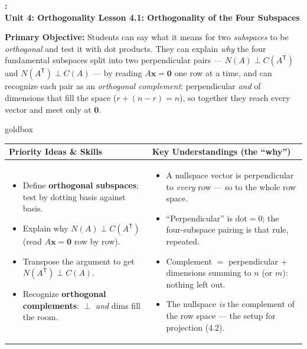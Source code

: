 \documentclass[10pt]{article}
\newcommand{\xx}{\mathbf{x}}
\newcommand{\zero}{\mathbf{0}}
\newcommand{\T}{\mathsf{T}}
\newcommand{\UnitNumberName}{Unit 4: Orthogonality \quad}
\newcommand{\LessonNumberName}{Lesson 4.1: Orthogonality of the Four Subspaces}
\begin{document}
\begin{center}
    {\Large\bfseries \CourseName: \SchoolYear \\
    {\small\bfseries \UnitNumberName \LessonNumberName}}
\end{center}

\begin{tcolorbox}[colback=blush, colframe=burgundy, boxrule=0.9pt, arc=2mm,
    left=2mm, right=2mm, top=1.5mm, bottom=1.5mm]
    \textbf{Primary Objective:} Students can say what it means for two \emph{subspaces} to be
    \emph{orthogonal} and test it with dot products. They can explain \emph{why} the four fundamental
    subspaces split into two perpendicular pairs --- $N(A)\perp C(A^{\T})$ and $N(A^{\T})\perp C(A)$ ---
    by reading $A\xx=\zero$ one row at a time, and can recognize each pair as an \emph{orthogonal
    complement}: perpendicular \emph{and} of dimensions that fill the space ($r+(n-r)=n$), so together
    they reach every vector and meet only at $\zero$.
\end{tcolorbox}

\renewcommand{\arraystretch}{1.4}
\begin{skillbox}{goldbox}
\begin{tabularx}{\linewidth}{@{}X|X@{}}
\textbf{Priority Ideas \& Skills} & \textbf{Key Understandings (the ``why'')} \\[2pt]
\hline
\vspace{-6pt}
\begin{itemize}[leftmargin=1.1em, nosep, after=\vspace{2pt}]
  \item Define \textbf{orthogonal subspaces}; test by dotting basis against basis.
  \item Explain why $N(A)\perp C(A^{\T})$ (read $A\xx=\zero$ row by row).
  \item Transpose the argument to get $N(A^{\T})\perp C(A)$.
  \item Recognize \textbf{orthogonal complements}: $\perp$ \emph{and} dims fill the room.
\end{itemize}
&
\vspace{-6pt}
\begin{itemize}[leftmargin=1.1em, nosep, after=\vspace{2pt}]
  \item A nullspace vector is perpendicular to \emph{every} row --- so to the whole row space.
  \item ``Perpendicular'' is $\text{dot}=0$; the four-subspace pairing is that rule, repeated.
  \item Complement $=$ perpendicular $+$ dimensions summing to $n$ (or $m$): nothing left out.
  \item The nullspace \emph{is} the complement of the row space --- the setup for projection (4.2).
\end{itemize}
\end{tabularx}
\end{skillbox}
\end{document}
